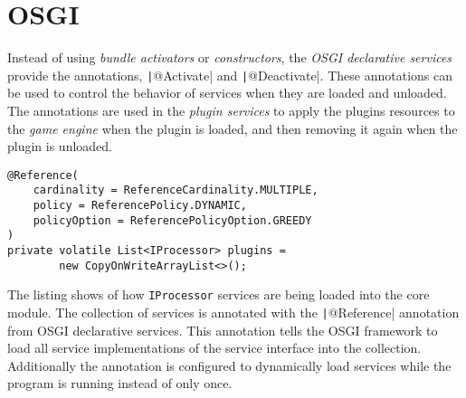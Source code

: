 \section{OSGI}

Instead of using \emph{bundle activators} or \emph{constructors},
the \emph{OSGI declarative services} provide the annotations,
\texttt|@Activate| and \texttt|@Deactivate|.
These annotations can be used to control the behavior of services when they
are loaded and unloaded.
The annotations are used in the \emph{plugin services} to apply the plugins
resources to the \emph{game engine} when the plugin is loaded,
and then removing it again when the plugin is unloaded.

\begin{listing}
\begin{verbatim}
@Reference(
    cardinality = ReferenceCardinality.MULTIPLE,
    policy = ReferencePolicy.DYNAMIC,
    policyOption = ReferencePolicyOption.GREEDY
)
private volatile List<IProcessor> plugins =
        new CopyOnWriteArrayList<>();
\end{verbatim}
\caption{The listing shows of how \texttt{IProcessor} services are being loaded
into the core module.
The collection of services is annotated with the \texttt|@Reference|
annotation from OSGI declarative services.
This annotation tells the OSGI framework to load all service implementations of
the service interface into the collection.
Additionally the annotation is configured to dynamically load services while
the program is running instead of only once.}
\label{lst:osgi-ref}
\end{listing}
